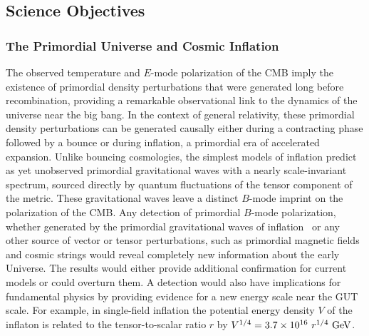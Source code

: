 
\subsection{Science Objectives}
\label{sec:science}

\vspace{-0.05in}
 
\subsubsection{The Primordial Universe and Cosmic Inflation}

\vspace{-0.05in}

The observed temperature and $E$-mode polarization of the \ac{CMB} imply the existence of primordial density perturbations that were generated long before recombination, providing a remarkable observational link to the dynamics of the universe near the big bang.
In the context of general relativity, these primordial density perturbations can be generated causally either during a contracting phase followed by a bounce or during inflation, a primordial era of accelerated expansion.
Unlike bouncing cosmologies, the simplest models of inflation predict as yet unobserved primordial gravitational waves with a nearly scale-invariant spectrum, sourced directly by quantum fluctuations of the tensor component of the metric. 
These gravitational waves leave a distinct $B$-mode imprint on the polarization of the \ac{CMB}. Any detection of primordial $B$-mode polarization, whether generated by the primordial gravitational waves of inflation~\cite{kamionkowski97a,zaldarriaga97} or any other source of vector or tensor perturbations, such as primordial magnetic fields \cite{Seshadri:2000ky,Lewis:2004ef,Ade:2015cao,Zucca:2016iur} and cosmic strings \cite{Turok:1997gj,Seljak:2006hi,Avgoustidis:2011ax,Moss:2014cra} would reveal completely new information about the early Universe. The results would either provide additional confirmation for current models or could overturn them. A detection would also have implications for fundamental physics by providing evidence for a new energy scale near the GUT scale. For example, in single-field inflation the potential energy density $V$ of the inflaton is related to the tensor-to-scalar ratio $r$ by $V^{1/4} = 3.7 \times 10^{16} \ r^{1/4}\,\, {\rm GeV}$. 

